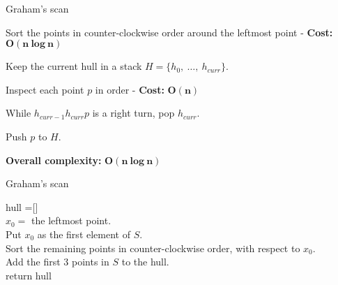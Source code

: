\documentclass[14pt]{beamer}
\begin{document}
\begin{frame}{Graham's scan}
	\begin{center}
		\vspace{-5mm}
		\begin{fullpageitemize}
			\item<1->[\rtarrow] Sort the points in counter-clockwise order around the leftmost point - \textbf{Cost:}  \textcolor{colorgreen}{$\bm{O(n\ log\ n)}$}
			\vspace{5mm}
			\item<2->[\rtarrow] Keep the current hull in a stack $H = \{h_0,\ \ldots,\ h_{curr}\}$.
			\vspace{5mm}
			
			\item<3->[\rtarrow] Inspect each point $p$ in order - \textbf{Cost:}  \textcolor{colorgreen}{$\bm{O(n)}$}
			
			\vspace{2mm}
			\fontsize{12}{14}\notosansfont
			\begin{sublist}
				\item<4->While $h_{curr-1}h_{curr}p$ is a right turn, pop $h_{curr}$.
				\item<5->Push $p$ to $H$.
			\end{sublist}
		
			\vspace{5mm}
			\item<6->[\rtarrow] \textbf{Overall complexity:} \textcolor{colorgreen}{$\bm{O(n\ log\ n)}$}
		\end{fullpageitemize}	
	\end{center}
\end{frame}

\begin{frame}{Graham's scan}
	\fontsize{10}{12}\notosansfont
	\begin{algorithm}[H]
		\DontPrintSemicolon
		\SetAlgoVlined
		hull =[]\\
		$x_0 =$ the leftmost point.\\
		Put $x_0$ as the first element of $S$.\\
		Sort the remaining points in counter-clockwise order, with respect to $x_0$.\\
		Add the first 3 points in $S$ to the hull. \\
		
		
		return hull
		\caption{Graham Scan}
	\end{algorithm}	
\end{frame}
\end{document}
